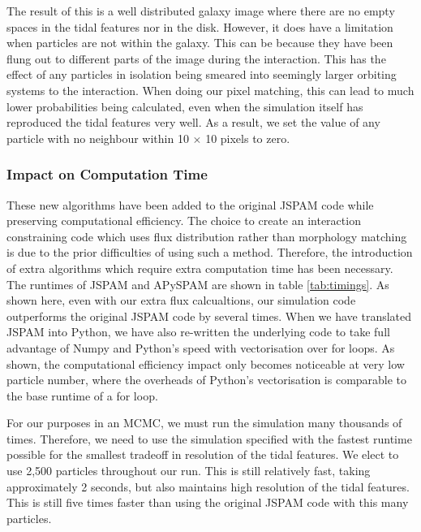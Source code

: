 The result of this is a well distributed galaxy image where there are no empty spaces in the tidal features nor in the disk. However, it does have a limitation when particles are not within the galaxy. This can be because they have been flung out to different parts of the image during the interaction. This has the effect of any particles in isolation being smeared into seemingly larger orbiting systems to the interaction. When doing our pixel matching, this can lead to much lower probabilities being calculated, even when the simulation itself has reproduced the tidal features very well. As a result, we set the value of any particle with no neighbour within 10 $\times$ 10 pixels to zero. 

\subsubsection{Impact on Computation Time}
These new algorithms have been added to the original JSPAM code while preserving computational efficiency. The choice to create an interaction constraining code which uses flux distribution rather than morphology matching is due to the prior difficulties of using such a method. Therefore, the introduction of extra algorithms which require extra computation time has been necessary. The runtimes of JSPAM and APySPAM are shown in table \ref{tab:timings}. As shown here, even with our extra flux calcualtions, our simulation code outperforms the original JSPAM code by several times. When we have translated JSPAM into Python, we have also re-written the underlying code to take full advantage of Numpy and Python's speed with vectorisation over for loops.  As shown, the computational efficiency impact only becomes noticeable at very low particle number, where the overheads of Python's vectorisation is comparable to the base runtime of a for loop.

For our purposes in an MCMC, we must run the simulation many thousands of times. Therefore, we need to use the simulation specified with the fastest runtime possible for the smallest tradeoff in resolution of the tidal features. We elect to use 2,500 particles throughout our run. This is still relatively fast, taking approximately 2 seconds, but also maintains high resolution of the tidal features. This is still five times faster than using the original JSPAM code with this many particles. 

